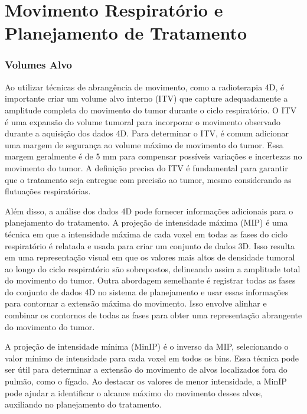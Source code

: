 \documentclass[11pt,a4paper]{article}
\begin{document}
\section{Movimento Respiratório e Planejamento de Tratamento}

\subsubsection*{Volumes Alvo}

	Ao utilizar técnicas de abrangência de movimento, como a radioterapia 4D, é importante criar um volume alvo interno (ITV) que capture adequadamente a amplitude completa do movimento do tumor durante o ciclo respiratório. O ITV é uma expansão do volume tumoral para incorporar o movimento observado durante a aquisição dos dados 4D. Para determinar o ITV, é comum adicionar uma margem de segurança ao volume máximo de movimento do tumor. Essa margem geralmente é de 5 mm para compensar possíveis variações e incertezas no movimento do tumor. A definição precisa do ITV é fundamental para garantir que o tratamento seja entregue com precisão ao tumor, mesmo considerando as flutuações respiratórias.

	Além disso, a análise dos dados 4D pode fornecer informações adicionais para o planejamento do tratamento. A projeção de intensidade máxima (MIP) é uma técnica em que a intensidade máxima de cada voxel em todas as fases do ciclo respiratório é relatada e usada para criar um conjunto de dados 3D. Isso resulta em uma representação visual em que os valores mais altos de densidade tumoral ao longo do ciclo respiratório são sobrepostos, delineando assim a amplitude total do movimento do tumor. Outra abordagem semelhante é registrar todas as fases do conjunto de dados 4D no sistema de planejamento e usar essas informações para contornar a extensão máxima do movimento. Isso envolve alinhar e combinar os contornos de todas as fases para obter uma representação abrangente do movimento do tumor.

	A projeção de intensidade mínima (MinIP) é o inverso da MIP, selecionando o valor mínimo de intensidade para cada voxel em todos os bins. Essa técnica pode ser útil para determinar a extensão do movimento de alvos localizados fora do pulmão, como o fígado. Ao destacar os valores de menor intensidade, a MinIP pode ajudar a identificar o alcance máximo do movimento desses alvos, auxiliando no planejamento do tratamento.
\end{document}
